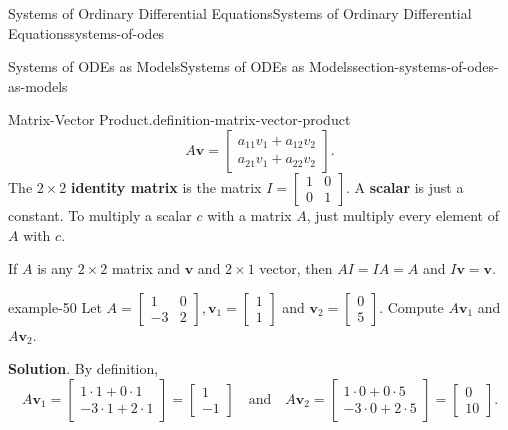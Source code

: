 \documentclass[oneside,10pt,]{book}
\newcommand{\terminology}[1]{\textbf{#1}}
\numberwithin{equation}{section}
\renewcommand{\vec}[1]{\mathbf{#1}}
\newcommand{\amp}{&}
\begin{document}
\begin{chapterptx}{Systems of Ordinary Differential Equations}{}{Systems of Ordinary Differential Equations}{}{}{systems-of-odes}
\begin{sectionptx}{Systems of ODEs as Models}{}{Systems of ODEs as Models}{}{}{section-systems-of-odes-as-models}
\begin{definition}{Matrix-Vector Product.}{definition-matrix-vector-product}
\begin{equation*}
A\vec{v} = \begin{bmatrix} a_{11}v_{1}+a_{12}v_{2}\\a_{21}v_{1}+a_{22}v_{2} \end{bmatrix}.
\end{equation*}
The \(2\times 2\) \terminology{identity matrix} is the matrix \(I = \begin{bmatrix}1\amp0\\0\amp1\end{bmatrix}\). A \terminology{scalar} is just a constant. To multiply a scalar \(c\) with a matrix \(A\), just multiply every element of \(A\) with \(c\).%
\end{definition}
\hypertarget{p-307}{}%
If \(A\) is any \(2\times2\) matrix and \(\vec{v}\) and \(2\times1\) vector, then \(AI=IA=A\) and \(I\vec{v} = \vec{v}\).%
\begin{example}{}{example-50}%
\hypertarget{p-308}{}%
Let \(A = \begin{bmatrix} 1\amp0\\-3\amp2 \end{bmatrix},\vec{v}_{1} = \begin{bmatrix}1\\1\end{bmatrix}\) and \(\vec{v}_{2} = \begin{bmatrix}0\\5\end{bmatrix}\). Compute \(A\vec{v}_{1}\) and \(A\vec{v}_{2}\).%
\par\smallskip%
\noindent\textbf{Solution}.\hypertarget{solution-47}{}\quad%
\hypertarget{p-309}{}%
By definition,%
\begin{equation*}
A\vec{v}_{1} = \begin{bmatrix}1\cdot1+0\cdot1\\-3\cdot1+2\cdot1\end{bmatrix} = \begin{bmatrix}1\\-1\end{bmatrix}\quad\text{and}\quad A\vec{v}_{2} = \begin{bmatrix}1\cdot0+0\cdot5\\-3\cdot0+2\cdot5\end{bmatrix} = \begin{bmatrix}0\\10\end{bmatrix}.
\end{equation*}
%
\end{example}

\end{sectionptx}
\end{chapterptx}
\end{document}
